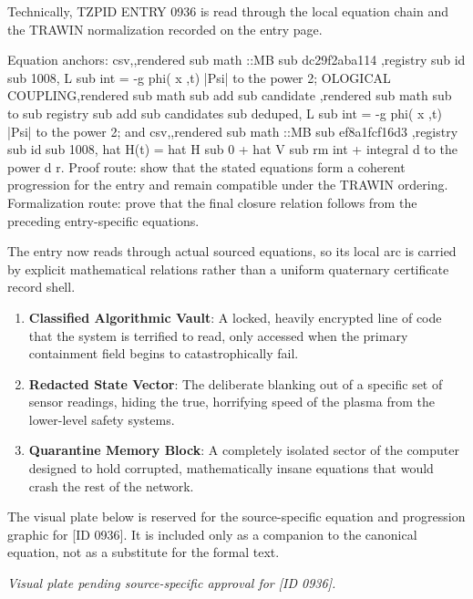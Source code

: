 Technically, TZPID ENTRY 0936 is read through the local equation chain and the TRAWIN normalization recorded on the entry page.

Equation anchors: csv,,rendered sub math ::MB sub dc29f2aba114 ,registry sub id sub 1008, L sub int = -g phi( x ,t) |Psi| to the power 2; OLOGICAL COUPLING,rendered sub math sub add sub candidate ,rendered sub math sub to sub registry sub add sub candidates sub deduped, L sub int = -g phi( x ,t) |Psi| to the power 2; and csv,,rendered sub math ::MB sub ef8a1fcf16d3 ,registry sub id sub 1008, hat H(t) = hat H sub 0 + hat V sub rm int + integral d to the power d r. Proof route: show that the stated equations form a coherent progression for the entry and remain compatible under the TRAWIN ordering. Formalization route: prove that the final closure relation follows from the preceding entry-specific equations.

The entry now reads through actual sourced equations, so its local arc is carried by explicit mathematical relations rather than a uniform quaternary certificate record shell.
\endgroup

\begin{enumerate}[leftmargin=1.6em,itemsep=6pt,topsep=4pt]
\item \textbf{Classified Algorithmic Vault}: A locked, heavily encrypted line of code that the system is terrified to read, only accessed when the primary containment field begins to catastrophically fail.
\item \textbf{Redacted State Vector}: The deliberate blanking out of a specific set of sensor readings, hiding the true, horrifying speed of the plasma from the lower-level safety systems.
\item \textbf{Quarantine Memory Block}: A completely isolated sector of the computer designed to hold corrupted, mathematically insane equations that would crash the rest of the network.
\end{enumerate}

\begingroup\footnotesize\sloppy
The visual plate below is reserved for the source-specific equation and progression graphic for [ID 0936]. It is included only as a companion to the canonical equation, not as a substitute for the formal text.
\par\endgroup
\begingroup\footnotesize\itshape
Visual plate pending source-specific approval for [ID 0936].
\par\endgroup

